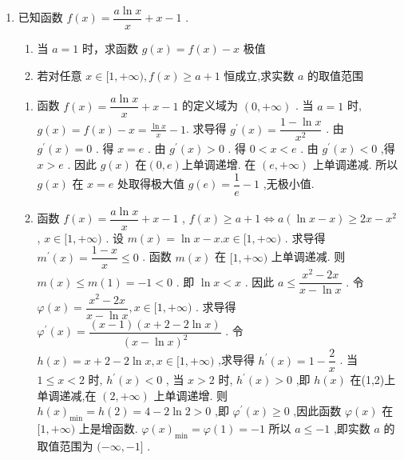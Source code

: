 \begin{enumerate}
    \item 已知函数 $f\left( x\right)  = \dfrac{a\ln x}{x} + x - 1$ .
    \begin{enumerate}
        \item 当 $a = 1$ 时，求函数 $g\left( x\right)  = f\left( x\right)  - x$ 极值
        \item 若对任意 $x \in  \lbrack 1, + \infty ),f\left( x\right)  \geq  a + 1$ 恒成立,求实数 $a$ 的取值范围
    \end{enumerate}
    \begin{jieda}
        \begin{enumerate}
            \item 函数 $f\left( x\right)  = \dfrac{a\ln x}{x} + x - 1$ 的定义域为 $\left( {0, + \infty }\right)$ . 当 $a = 1$ 时, $g\left( x\right)  = f\left( x\right)  - x = \frac{\ln x}{x} - 1$.
            求导得 ${g}^{\prime }\left( x\right)  = \dfrac{1 - \ln x}{{x}^{2}}$ . 由 ${g}^{\prime }\left( x\right)  = 0$ . 得 $x = {e}$ . 由 ${g}^{\prime }\left( x\right)  > 0$ . 得 $0 < x < {e}$ . 由 ${g}^{\prime }\left( x\right)  < 0$ ,得 $x > {e}$ .
            因此 $g\left( x\right)$ 在$(0,e)$上单调递增. 在 $\left( {{e}, + \infty }\right)$ 上单调递减.
            所以 $g\left( x\right)$ 在 $x = {e}$ 处取得极大值 $g\left( {e}\right)  = \dfrac{1}{{e}} - 1$ ,无极小值.
            \item 函数 $f\left( x\right)  = \dfrac{a\ln x}{x} + x - 1$ , $f\left( x\right)  \geq  a + 1 \Longleftrightarrow  a\left( {\ln x - x}\right)  \geq  {2x} - {x}^{2}$ , $x \in  \lbrack 1, + \infty )$ .
            设 $m\left( x\right)  = \ln x - x.x \in  \lbrack 1, + \infty )$ . 求导得 ${m}^{\prime }\left( x\right)  = \dfrac{1 - x}{x} \leq  0$ . 函数 $m\left( x\right)$ 在 $\lbrack 1, + \infty )$ 上单调递减.
            则 $m\left( x\right)  \leq  m\left( 1\right)  =  - 1 < 0$ . 即 $\ln x < x$ . 因此 $a \leq  \dfrac{{x}^{2} - {2x}}{x - \ln x}$ .
            令 $\varphi \left( x\right)  = \dfrac{{x}^{2} - {2x}}{x - \ln x},x \in  \lbrack 1, + \infty )$ . 求导得 ${\varphi }^{\prime }\left( x\right)  = \dfrac{\left( {x - 1}\right) \left( {x + 2 - 2\ln x}\right) }{{\left( x - \ln x\right) }^{2}}$ .
            令 $h\left( x\right)  = x + 2 - 2\ln x,x \in  \lbrack 1, + \infty )$ ,求导得 ${h}^{\prime }\left( x\right)  = 1 - \dfrac{2}{x}$ . 当 $1 \leq  x < 2$ 时, ${h}^{\prime }\left( x\right)  < 0$ ,
            当 $x > 2$ 时, ${h}^{\prime }\left( x\right)  > 0$ ,即 $h\left( x\right)$ 在(1,2)上单调递减,在 $\left( {2, + \infty }\right)$ 上单调递增.
            则 $h{\left( x\right) }_{\min } = h\left( 2\right)  = 4 - 2\ln 2 > 0$ ,即 ${\varphi }^{\prime }\left( x\right)  \geq  0$ ,因此函数 $\varphi \left( x\right)$ 在 $\lbrack 1, + \infty )$ 上是增函数.
            $\varphi {\left( x\right) }_{\min } = \varphi \left( 1\right)  =  - 1$
            所以 $a \leq   - 1$ ,即实数 $a$ 的取值范围为 $( - \infty , - 1\rbrack$ .
        \end{enumerate}
    \end{jieda}
\end{enumerate}